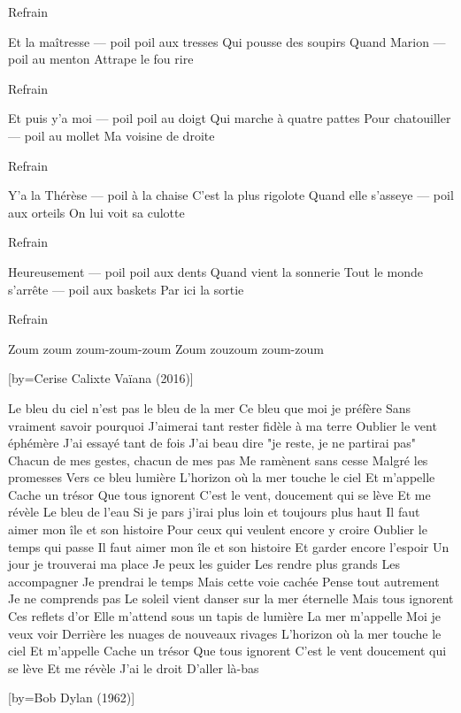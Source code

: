 \beginverse
Refrain
\endverse

\beginverse
Et la maîtresse — poil poil aux tresses
Qui pousse des soupirs
Quand Marion — poil au menton
Attrape le fou rire
\endverse

\beginverse
Refrain
\endverse

\beginverse
Et puis y’a moi — poil poil au doigt
Qui marche à quatre pattes
Pour chatouiller — poil au mollet
Ma voisine de droite
\endverse

\beginverse
Refrain
\endverse

\beginverse
Y'a la Thérèse — poil à la chaise
C’est la plus rigolote
Quand elle s’asseye — poil aux orteils
On lui voit sa culotte
\endverse

\beginverse
Refrain
\endverse

\beginverse
Heureusement — poil poil aux dents
Quand vient la sonnerie
Tout le monde s’arrête — poil aux baskets
Par ici la sortie
\endverse

\beginverse
Refrain
\endverse

\beginverse
Zoum zoum zoum-zoum-zoum
Zoum zouzoum zoum-zoum
\endverse

[by={Cerise Calixte \- Vaïana (2016)}]

\beginverse
Le bleu du ciel n'est pas le bleu de la mer
Ce bleu que moi je préfère
Sans vraiment savoir pourquoi
J'aimerai tant rester fidèle à ma terre
Oublier le vent éphémère
J'ai essayé tant de fois
J'ai beau dire "je reste, je ne partirai pas"
Chacun de mes gestes, chacun de mes pas
Me ramènent sans cesse
Malgré les promesses
Vers ce bleu lumière
L'horizon où la mer touche le ciel
Et m'appelle
Cache un trésor
Que tous ignorent
C'est le vent, doucement qui se lève
Et me révèle
Le bleu de l'eau
Si je pars j'irai plus loin et toujours plus haut
Il faut aimer mon île et son histoire
Pour ceux qui veulent encore y croire
Oublier le temps qui passe
Il faut aimer mon île et son histoire
Et garder encore l'espoir
Un jour je trouverai ma place
Je peux les guider
Les rendre plus grands
Les accompagner
Je prendrai le temps
Mais cette voie cachée
Pense tout autrement
Je ne comprends pas
Le soleil vient danser sur la mer éternelle
Mais tous ignorent
Ces reflets d'or
Elle m'attend sous un tapis de lumière
La mer m'appelle
Moi je veux voir
Derrière les nuages de nouveaux rivages
L'horizon où la mer touche le ciel
Et m'appelle
Cache un trésor
Que tous ignorent
C'est le vent doucement qui se lève
Et me révèle
J'ai le droit
D'aller là-bas
\endverse

[by={Bob Dylan (1962)}]

